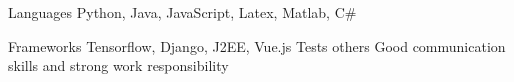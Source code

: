 \begin{cvskills}
  \cvskill
    {Languages} %
    {Python, Java, JavaScript, Latex, Matlab, C\#} %

  \cvskill
    {Frameworks} %
    {Tensorflow, Django, J2EE, Vue.js} %
  \cvskill
    {Tests} %
    {} %
  \cvskill
  	{others}
  	{Good communication skills and strong work responsibility}
\end{cvskills}
